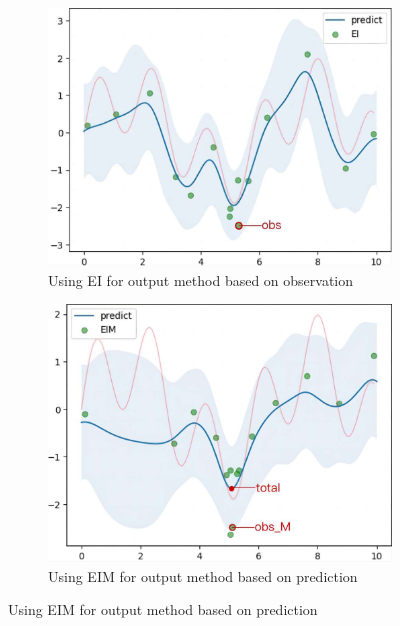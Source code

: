 \documentclass{article}
\begin{document}
\begin{figure}[H]
    \centering
    \begin{subfigure}[t]{.4\linewidth}
        \centering
        \includegraphics[width=1\textwidth]{figures/EI.jpg}
        \caption{Using EI for output method based on observation}
    \end{subfigure}
    \begin{subfigure}[t]{.4\linewidth}
        \centering
        \includegraphics[width=1\textwidth]{figures/EIM.jpg}
        \caption{Using EIM for output method based on prediction}
    \end{subfigure}

\end{figure}
\end{document}
